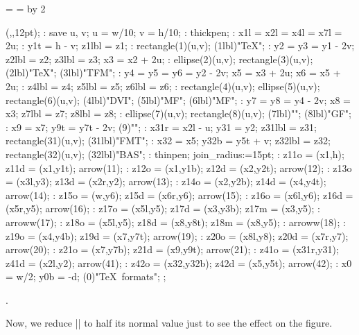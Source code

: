 =\box\MTbox
{}=\hsize %
\divide{} by 2

\ifdim\hsize<10cm \let\figfont=\smallsf \def\driver{drv}
 \else \let\figfont=\sf \def\driver{Driver}\fi

\MTbeginchar(\the\hsize,\the{},12pt);
\MT: save u, v; u = w/10; v = h/10;
\MT: thickpen;
\MT: x1l = x2l = x4l = x7l = 2u;
\MT: y1t = h - v; z1lbl = z1;
\MT: rectangle(1)(u,v);
\MTlabel(1lbl)"\figfont\TeX";
\MT: y2 = y3 = y1 - 2v; z2lbl = z2; z3lbl = z3; x3 = x2 + 2u;
\MT: ellipse(2)(u,v); rectangle(3)(u,v);
\MTlabel(2lbl)"\figfont\TeX"; \MTlabel(3lbl)"\figfont TFM";
\MT: y4 = y5 = y6 = y2 - 2v; x5 = x3 + 2u; x6 = x5 + 2u;
\MT: z4lbl = z4; z5lbl = z5; z6lbl = z6;
\MT: rectangle(4)(u,v); ellipse(5)(u,v); rectangle(6)(u,v);
\MTlabel(4lbl)"\figfont DVI"; \MTlabel(5lbl)"\figfont MF";
\MTlabel(6lbl)"\figfont MF";
\MT: y7 = y8 = y4 - 2v; x8 = x3; z7lbl = z7; z8lbl = z8;
\MT: ellipse(7)(u,v); rectangle(8)(u,v);
\MTlabel(7lbl)"\figfont\driver"; \MTlabel(8lbl)"\figfont GF";
\MT: x9 = x7; y9t = y7t - 2v;
\MTlabel(9)"";
\MT: x31r = x2l - u; y31 = y2; z31lbl = z31; rectangle(31)(u,v);
\MTlabel(31lbl)"\figfont FMT";
\MT: x32 = x5; y32b = y5t + v; z32lbl = z32; rectangle(32)(u,v);
\MTlabel(32lbl)"\figfont BAS";
\MT: thinpen; join_radius:=15pt;
\MT: z11o = (x1,h); z11d = (x1,y1t); arrow(11);
\MT: z12o = (x1,y1b); z12d = (x2,y2t); arrow(12);
\MT: z13o = (x3l,y3); z13d = (x2r,y2); arrow(13);
\MT: z14o = (x2,y2b); z14d = (x4,y4t); arrow(14);
\MT: z15o = (w,y6); z15d = (x6r,y6); arrow(15);
\MT: z16o = (x6l,y6); z16d = (x5r,y5); arrow(16);
\MT: z17o = (x5l,y5); z17d = (x3,y3b); z17m = (x3,y5);
\MT: arroww(17);
\MT: z18o = (x5l,y5); z18d = (x8,y8t); z18m = (x8,y5);
\MT: arroww(18);
\MT: z19o = (x4,y4b); z19d = (x7,y7t); arrow(19);
\MT: z20o = (x8l,y8); z20d = (x7r,y7); arrow(20);
\MT: z21o = (x7,y7b); z21d = (x9,y9t); arrow(21);
\MT: z41o = (x31r,y31); z41d = (x2l,y2); arrow(41);
\MT: z42o = (x32,y32b); z42d = (x5,y5t); arrow(42);
\MT: x0 = w/2; y0b = -d;
\MTlabel(0)"\rm \TeX\ formats";
\MTendchar;

\centerline{\box\MTbox}
.




\divide{}
Now, we reduce |\hsize| to half its normal value just to see the
effect on the figure.



\bigbreak

\multiply{}

